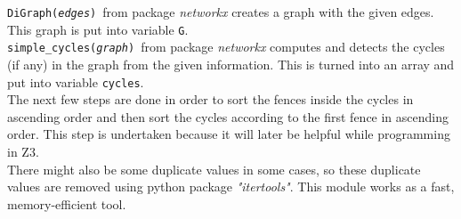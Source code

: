 \documentclass[dvipsnames]{article}
\newcommand{\var}[1]{\color{OliveGreen} \texttt{#1}\color{black}}
\newcommand{\fun}[2]{\color{Sepia}\texttt{#1(\color{Gray}\textit{#2}\color{Sepia})}\color{black}}
\begin{document}
\fun{DiGraph}{edges}\ from package \textit{networkx} creates a graph with the given edges. This graph is put into variable \var{G}.\\

\fun{simple\_cycles}{graph}\ from package \textit{networkx} computes and detects the cycles (if any) in the graph from the given information. This is turned into an array and put into variable \var{cycles}.\\

The next few steps are done in order to sort the fences inside the cycles in ascending order and then sort the cycles according to the first fence in ascending order. This step is undertaken because it will later be helpful while programming in Z3.\\

There might also be some duplicate values in some cases, so these duplicate values are removed using python package \textit{"itertools"}. This module works as a fast, memory-efficient tool.
\end{document}
